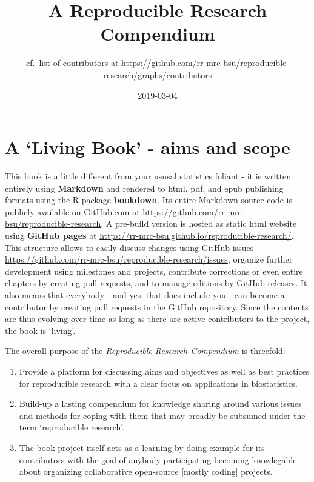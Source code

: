 \documentclass[]{book}
\title{A Reproducible Research Compendium}
\author{cf.~list of contributors at
\url{https://github.com/rr-mrc-bsu/reproducible-research/graphs/contributors}}
\date{2019-03-04}
\providecommand{\tightlist}{%
  \setlength{\itemsep}{0pt}\setlength{\parskip}{0pt}}
\begin{document}
\maketitle

{
\setcounter{tocdepth}{1}
\tableofcontents
}
\chapter{\texorpdfstring{A `Living Book' - aims and
scope}{A Living Book - aims and scope}}\label{a-living-book---aims-and-scope}

This book is a little different from your ususal statistics foliant - it
is written entirely using \textbf{Markdown} and rendered to html, pdf,
and epub publishing formats using the R package \textbf{bookdown}. Its
entire Markdown source code is publicly available on GitHub.com at
\url{https://github.com/rr-mrc-bsu/reproducible-research}. A pre-build
version is hosted as static html website using \textbf{GitHub pages} at
\url{https://rr-mrc-bsu.github.io/reproducible-research/}. This
structure allows to easily discuss changes using GitHub issues
\url{https://github.com/rr-mrc-bsu/reproducible-research/issues},
organize further development using milestones and projects, contribute
corrections or even entire chapters by creating pull requests, and to
manage editions by GitHub releases. It also means that everybody - and
yes, that does include you - can become a contributor by creating pull
requests in the GitHub repository. Since the contents are thus evolving
over time as long as there are active contributors to the project, the
book is `living'.

The overall purpose of the \emph{Reproducible Research Compendium} is
threefold:

\begin{enumerate}
\def\labelenumi{\arabic{enumi}.}
\tightlist
\item
  Provide a platform for discussing aims and objectives as well as best
  practices for reproducible research with a clear focus on applications
  in biostatistics.
\item
  Build-up a lasting compendium for knowledge sharing around various
  issues and methods for coping with them that may broadly be subsumed
  under the term `reproducible research'.
\item
  The book project itself acts as a learning-by-doing example for its
  contributors with the goal of anybody participating becoming
  knowlegable about organizing collaborative open-source {[}mostly
  coding{]} projects.
\end{enumerate}
\end{document}
